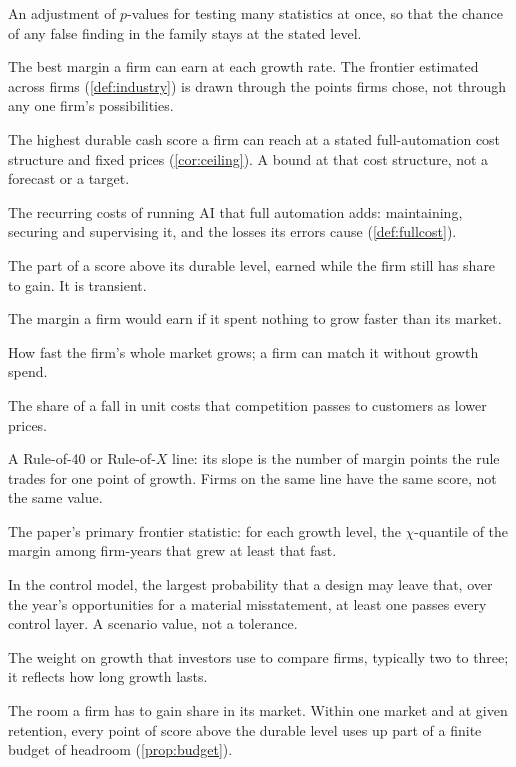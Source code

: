 {\begin{description}[leftmargin=0pt,itemsep=2pt]
\item[Familywise correction.] An adjustment of $p$-values for testing many statistics at once, so that the chance of any false finding in the family stays at the stated level.
\item[Frontier.] The best margin a firm can earn at each growth rate. The frontier estimated across firms (\autoref{def:industry}) is drawn through the points firms chose, not through any one firm's possibilities.
\item[Full-automation ceiling ($R_{\max}$).] The highest durable cash score a firm can reach at a stated full-automation cost structure and fixed prices (\autoref{cor:ceiling}). A bound at that cost structure, not a forecast or a target.
\item[Full-cost floors.] The recurring costs of running AI that full automation adds: maintaining, securing and supervising it, and the losses its errors cause (\autoref{def:fullcost}).
\item[Growth surplus ($\Pi$).] The part of a score above its durable level, earned while the firm still has share to gain. It is transient.
\item[Margin intercept ($m_0$).] The margin a firm would earn if it spent nothing to grow faster than its market.
\item[Market growth ($G$).] How fast the firm's whole market grows; a firm can match it without growth spend.
\item[Pass-through.] The share of a fall in unit costs that competition passes to customers as lower prices.
\item[Price line.] A Rule-of-40 or Rule-of-$X$ line: its slope is the number of margin points the rule trades for one point of growth. Firms on the same line have the same score, not the same value.
\item[$\Psi_\chi$.] The paper's primary frontier statistic: for each growth level, the $\chi$-quantile of the margin among firm-years that grew at least that fast.
\item[Remote threshold ($\bar\pi$).] In the control model, the largest probability that a design may leave that, over the year's opportunities for a material misstatement, at least one passes every control layer. A scenario value, not a tolerance.
\item[Screening weight.] The weight on growth that investors use to compare firms, typically two to three; it reflects how long growth lasts.
\item[Share headroom and the score budget.] The room a firm has to gain share in its market. Within one market and at given retention, every point of score above the durable level uses up part of a finite budget of headroom (\autoref{prop:budget}).

\end{description}}
